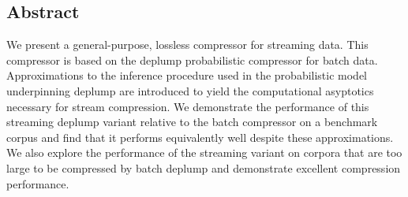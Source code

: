 \subsection*{Abstract}

We present a general-purpose, lossless compressor for  streaming data.  This compressor is based on the deplump probabilistic compressor for batch data.  Approximations to the inference procedure used in the probabilistic model underpinning deplump are introduced to yield the computational asyptotics necessary for stream compression. We demonstrate the performance of this streaming deplump variant relative to the batch compressor on a benchmark corpus and find that it performs equivalently well despite these approximations.  We also explore the performance of the streaming variant on corpora that are too large to be compressed by batch deplump and demonstrate excellent compression performance.

